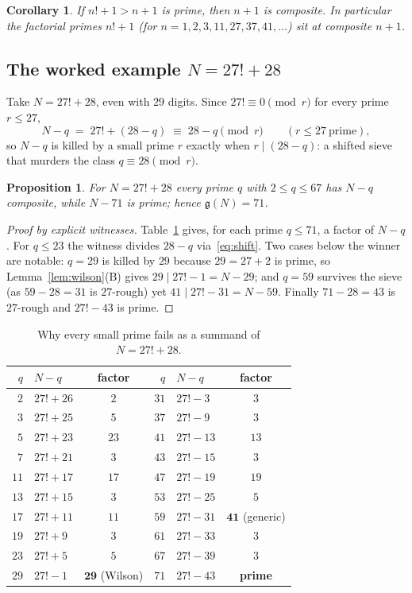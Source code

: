 \documentclass[11pt]{article}
\theoremstyle{plain}
\newtheorem{proposition}[theorem]{Proposition}
\newtheorem{corollary}[theorem]{Corollary}
\theoremstyle{definition}
\theoremstyle{remark}
\newcommand{\N}{N}
\newcommand{\g}{\mathfrak{g}}
\begin{document}
\begin{corollary}\label{cor:facprime}
If $n!+1>n+1$ is prime, then $n+1$ is composite. In particular the factorial
primes $n!+1$ (for $n=1,2,3,11,27,37,41,\dots$) sit at composite $n+1$.
\end{corollary}

\subsection{The worked example $\N=27!+28$}

Take $\N=27!+28$, even with $29$ digits. Since $27!\equiv0\pmod r$ for every prime
$r\le27$,
\begin{equation}\label{eq:shift}
\N-q\;=\;27!+(28-q)\;\equiv\;28-q\pmod r\qquad(r\le27\ \text{prime}),
\end{equation}
so $\N-q$ is killed by a small prime $r$ exactly when $r\mid(28-q)$: a shifted
sieve that murders the class $q\equiv28\pmod r$.

\begin{proposition}\label{prop:71}
For $\N=27!+28$ every prime $q$ with $2\le q\le67$ has $\N-q$ composite, while
$\N-71$ is prime; hence $\g(\N)=71$.
\end{proposition}
\begin{proof}[Proof by explicit witnesses]
Table~\ref{tab:witness} gives, for each prime $q\le71$, a factor of $\N-q$. For
$q\le23$ the witness divides $28-q$ via~\eqref{eq:shift}. Two cases below the
winner are notable: $q=29$ is killed by $29$ because $29=27+2$ is prime, so
Lemma~\ref{lem:wilson}(B) gives $29\mid27!-1=\N-29$; and $q=59$ survives the
sieve (as $59-28=31$ is $27$-rough) yet $41\mid27!-31=\N-59$. Finally
$71-28=43$ is $27$-rough and $27!-43$ is prime.
\end{proof}

\begin{table}[h]
\centering\small
\caption{Why every small prime fails as a summand of $\N=27!+28$.}\label{tab:witness}
\begin{tabular}{rlc@{\qquad}rlc}
\toprule
$q$ & $\N-q$ & factor & $q$ & $\N-q$ & factor\\
\midrule
$2$&$27!+26$&$2$ & $31$&$27!-3$&$3$\\
$3$&$27!+25$&$5$ & $37$&$27!-9$&$3$\\
$5$&$27!+23$&$23$ & $41$&$27!-13$&$13$\\
$7$&$27!+21$&$3$ & $43$&$27!-15$&$3$\\
$11$&$27!+17$&$17$ & $47$&$27!-19$&$19$\\
$13$&$27!+15$&$3$ & $53$&$27!-25$&$5$\\
$17$&$27!+11$&$11$ & $59$&$27!-31$&$\mathbf{41}$ (generic)\\
$19$&$27!+9$&$3$ & $61$&$27!-33$&$3$\\
$23$&$27!+5$&$5$ & $67$&$27!-39$&$3$\\
$29$&$27!-1$&$\mathbf{29}$ (Wilson) & $71$&$27!-43$&\textbf{prime}\\
\bottomrule
\end{tabular}
\end{table}
\end{document}
